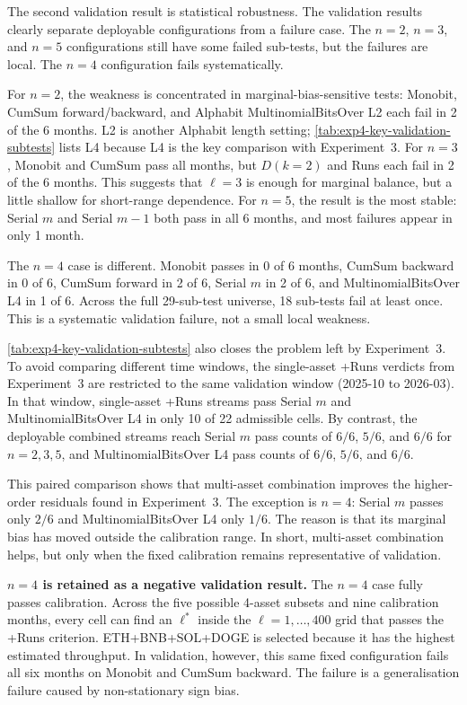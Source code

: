 \documentclass[11pt,titlepage,openany,oneside]{book}  %
\begin{document}
The second validation result is statistical robustness. The validation results clearly separate deployable configurations from a failure case. The $n=2$, $n=3$, and $n=5$ configurations still have some failed sub-tests, but the failures are local. The $n=4$ configuration fails systematically.

For $n=2$, the weakness is concentrated in marginal-bias-sensitive tests: Monobit, CumSum forward/backward, and Alphabit MultinomialBitsOver L2 each fail in 2 of the 6 months. L2 is another Alphabit length setting; \cref{tab:exp4-key-validation-subtests} lists L4 because L4 is the key comparison with Experiment~3. For $n=3$, Monobit and CumSum pass all months, but $D(k=2)$ and Runs each fail in 2 of the 6 months. This suggests that $\ell=3$ is enough for marginal balance, but a little shallow for short-range dependence. For $n=5$, the result is the most stable: Serial $m$ and Serial $m{-}1$ both pass in all 6 months, and most failures appear in only 1 month.

The $n=4$ case is different. Monobit passes in 0 of 6 months, CumSum backward in 0 of 6, CumSum forward in 2 of 6, Serial $m$ in 2 of 6, and MultinomialBitsOver L4 in 1 of 6. Across the full 29-sub-test universe, 18 sub-tests fail at least once. This is a systematic validation failure, not a small local weakness.

\cref{tab:exp4-key-validation-subtests} also closes the problem left by Experiment~3. To avoid comparing different time windows, the single-asset +Runs verdicts from Experiment~3 are restricted to the same validation window (2025-10 to 2026-03). In that window, single-asset +Runs streams pass Serial $m$ and MultinomialBitsOver L4 in only 10 of 22 admissible cells. By contrast, the deployable combined streams reach Serial $m$ pass counts of $6/6$, $5/6$, and $6/6$ for $n=2,3,5$, and MultinomialBitsOver L4 pass counts of $6/6$, $5/6$, and $6/6$.

This paired comparison shows that multi-asset combination improves the higher-order residuals found in Experiment~3. The exception is $n=4$: Serial $m$ passes only $2/6$ and MultinomialBitsOver L4 only $1/6$. The reason is that its marginal bias has moved outside the calibration range. In short, multi-asset combination helps, but only when the fixed calibration remains representative of validation.

\textbf{$n=4$ is retained as a negative validation result.} The $n=4$ case fully passes calibration. Across the five possible 4-asset subsets and nine calibration months, every cell can find an $\ell^*$ inside the $\ell=1,\ldots,400$ grid that passes the +Runs criterion. ETH+BNB+SOL+DOGE is selected because it has the highest estimated throughput. In validation, however, this same fixed configuration fails all six months on Monobit and CumSum backward. The failure is a generalisation failure caused by non-stationary sign bias.
\end{document}
